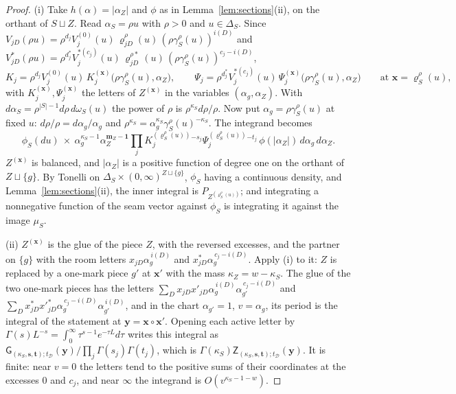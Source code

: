 \documentclass[11pt]{article}
\theoremstyle{plain}
\theoremstyle{definition}
\theoremstyle{remark}
\newcommand{\cD}{\mathcal D}
\newcommand{\bm}{\mathbf m}
\newcommand{\bx}{\mathbf x}
\newcommand{\sG}{\mathsf G}
\newcommand{\sZ}{\mathsf Z}
\begin{document}
\begin{proof}
(i) Take $h(\alpha)=|\alpha_Z|$ and $\phi$ as in Lemma~\ref{lem:sections}(ii), on the orthant of $S\sqcup Z$. Read $\alpha_S=\rho u$ with $\rho>0$ and $u\in\Delta_S$. Since $V_{jD}(\rho u)=\rho^{d_j}V^{(0)}_j(u)\,\varrho^\rho_{jD}(u)\,(\rho\gamma^\rho_S(u))^{i(D)}$ and $V^\ast_{jD}(\rho u)=\rho^{d^\ast_j}V^{\ast(c_j)}_j(u)\,\varrho^{\rho\ast}_{jD}(u)\,(\rho\gamma^\rho_S(u))^{c_j-i(D)}$,
\[
K_j=\rho^{d_j}V^{(0)}_j(u)\,K^{(\bx)}_j\big(\rho\gamma^\rho_S(u),\alpha_Z\big),\qquad \Psi_j=\rho^{d^\ast_j}V^{\ast(c_j)}_j(u)\,\Psi^{(\bx)}_j\big(\rho\gamma^\rho_S(u),\alpha_Z\big)\qquad\text{at }\bx=\boldsymbol\varrho^\rho_S(u),
\]
with $K^{(\bx)}_j,\Psi^{(\bx)}_j$ the letters of $Z^{(\bx)}$ in the variables $(\alpha_g,\alpha_Z)$. With $d\alpha_S=\rho^{|S|-1}d\rho\,d\omega_S(u)$ the power of $\rho$ is $\rho^{\kappa_S}d\rho/\rho$. Now put $\alpha_g=\rho\gamma^\rho_S(u)$ at fixed $u$: $d\rho/\rho=d\alpha_g/\alpha_g$ and $\rho^{\kappa_S}=\alpha_g^{\kappa_S}\gamma^\rho_S(u)^{-\kappa_S}$. The integrand becomes
\[
\phi_S(du)\ \times\ \alpha_g^{\kappa_S-1}\alpha_Z^{\bm_Z-\mathbf 1}\prod_jK^{(\boldsymbol\varrho^\rho_S(u))}_j{}^{-s_j}\Psi^{(\boldsymbol\varrho^\rho_S(u))}_j{}^{-t_j}\,\phi(|\alpha_Z|)\,d\alpha_g\,d\alpha_Z .
\]
$Z^{(\bx)}$ is balanced, and $|\alpha_Z|$ is a positive function of degree one on the orthant of $Z\sqcup\{g\}$. By Tonelli on $\Delta_S\times(0,\infty)^{Z\sqcup\{g\}}$, $\phi_S$ having a continuous density, and Lemma~\ref{lem:sections}(ii), the inner integral is $P_{Z^{(\boldsymbol\varrho^\rho_S(u))}}$; and integrating a nonnegative function of the seam vector against $\phi_S$ is integrating it against the image $\mu_S$.

(ii) $Z^{(\bx)}$ is the glue of the piece $Z$, with the reversed excesses, and the partner on $\{g\}$ with the room letters $x_{jD}\alpha_g^{\,i(D)}$ and $x^\ast_{jD}\alpha_g^{\,c_j-i(D)}$. Apply (i) to it: $Z$ is replaced by a one-mark piece $g'$ at $\bx'$ with the mass $\kappa_Z=w-\kappa_S$. The glue of the two one-mark pieces has the letters $\sum_Dx_{jD}x'_{jD}\alpha_g^{\,i(D)}\alpha_{g'}^{\,c_j-i(D)}$ and $\sum_Dx^\ast_{jD}x'^\ast_{jD}\alpha_g^{\,c_j-i(D)}\alpha_{g'}^{\,i(D)}$, and in the chart $\alpha_{g'}=1$, $v=\alpha_g$, its period is the integral of the statement at $\mathbf y=\bx\circ\bx'$. Opening each active letter by $\Gamma(s)L^{-s}=\int_0^\infty\tau^{s-1}e^{-\tau L}d\tau$ writes this integral as $\sG_{(\kappa_S,\mathbf s,\mathbf t);t_{\cD}}(\mathbf y)/\prod_j\Gamma(s_j)\Gamma(t_j)$, which is $\Gamma(\kappa_S)\sZ_{(\kappa_S,\mathbf s,\mathbf t);t_{\cD}}(\mathbf y)$. It is finite: near $v=0$ the letters tend to the positive sums of their coordinates at the excesses $0$ and $c_j$, and near $\infty$ the integrand is $O(v^{\kappa_S-1-w})$.
\end{proof}
\end{document}
